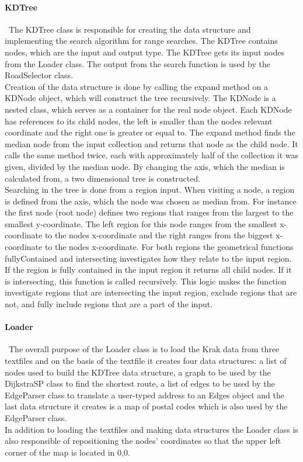 \documentclass[a4paper,10pt,titlepage]{article}
\begin{document}
				\paragraph{KDTree}\mbox{}\
				The KDTree class is responsible for creating the data structure and implementing the search algorithm for range searches. The KDTree contains nodes, which are the input and output type. The KDTree gets its input nodes from the Loader class. The output from the search function is used by the RoadSelector class.\\
Creation of the data structure is done by calling the expand method on a KDNode object, which will construct the tree recursively. The KDNode is a nested class, which serves as a container for the real node object. Each KDNode has references to its child nodes, the left is smaller than the nodes relevant coordinate and the right one is greater or equal to. The expand method finds the median node from the input collection and returns that node as the child node. It calls the same method twice, each with approximately half of the collection it was given, divided by the median node. By changing the axis, which the median is calculated from, a two dimensional tree is constructed.\\
Searching in the tree is done from a region input. When visiting a node, a region is defined from the axis, which the node was chosen as median from. For instance the first node (root node) defines two regions that ranges from the largest to the smallest y-coordinate. The left region for this node ranges from the smallest x-coordinate to the nodes x-coordinate and the right ranges from the biggest x-coordinate to the nodes x-coordinate. For both regions the geometrical functions fullyContained and intersecting investigates how they relate to the input region. If the region is fully contained in the input region it returns all child nodes. If it is intersecting, this function is called recursively. This logic makes the function investigate regions that are intersecting the input region, exclude regions that are not, and fully include regions that are a part of the input.

				
				\paragraph{Loader}\mbox{}\
The overall purpose of the Loader class is to load the Krak data from three textfiles and on the basis of the textfile it creates four data structures: a list of nodes used to build the KDTree data structure, a graph to be used by the DijkstraSP class to find the shortest route, a list of edges to be used by the EdgeParser class to translate a user-typed address to an Edges object and the last data structure it creates is a map of postal codes which is also used by the EdgeParser class.\\
In addition to loading the textfiles and making data structures the Loader class is also responsible of repositioning the nodes' coordinates so that the upper left corner of the map is located in 0,0.
\end{document}

